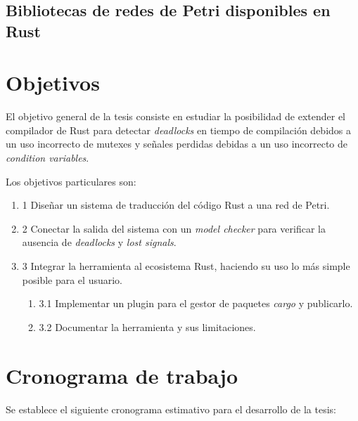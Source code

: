 \documentclass[12pt]{article}
\begin{document}
\subsection{Bibliotecas de redes de Petri disponibles en Rust}
\label{petri-net-libs}

\bigskip

\section{Objetivos}

El objetivo general de la tesis consiste en estudiar la posibilidad de extender el compilador de Rust
para detectar \textit{deadlocks} en tiempo de compilación debidos a un uso incorrecto de mutexes
y señales perdidas debidas a un uso incorrecto de \textit{condition variables}.

Los objetivos particulares son:

\begin{enumerate}
    \item 1 Diseñar un sistema de traducción del código Rust a una red de Petri.
    \item 2 Conectar la salida del sistema con un \textit{model checker} para verificar la ausencia de \textit{deadlocks} y \textit{lost signals}.
    \item 3 Integrar la herramienta al ecosistema Rust, haciendo su uso lo más simple posible para el usuario.
          \begin{enumerate}
              \item 3.1 Implementar un plugin para el gestor de paquetes \textit{cargo} y publicarlo.
              \item 3.2 Documentar la herramienta y sus limitaciones.
          \end{enumerate}
\end{enumerate}

\bigskip

\section{Cronograma de trabajo}

Se establece el siguiente cronograma estimativo para el desarrollo de la tesis:

\bigskip
\end{document}
